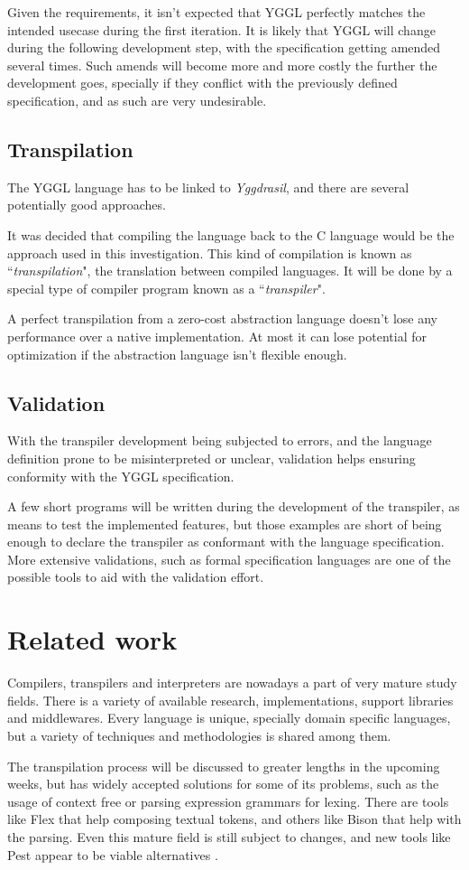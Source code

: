 \documentclass[runningheads]{llncs}
\begin{document}
\par Given the requirements, it isn't expected that YGGL perfectly matches the intended usecase during the first iteration. It is likely that YGGL will change during the following development step, with the specification getting amended several times. Such amends will become more and more costly the further the development goes, specially if they conflict with the previously defined specification, and as such are very undesirable.
\subsection{Transpilation}
The YGGL language has to be linked to \textit{Yggdrasil}, and there are several potentially good approaches.
\par It was decided that compiling the language back to the C language would be the approach used in this investigation. This kind of compilation is known as ``\textit{transpilation}", the translation between compiled languages. It will be done by a special type of compiler program known as a ``\textit{transpiler}".
\par A perfect transpilation from a zero-cost abstraction language doesn't lose any performance over a native implementation. At most it can lose potential for optimization if the abstraction language isn't flexible enough.
\subsection{Validation}
With the transpiler development being subjected to errors, and the language definition prone to be misinterpreted or unclear, validation helps ensuring conformity with the YGGL specification.
\par A few short programs will be written during the development of the transpiler, as means to test the implemented features, but those examples are short of being enough to declare the transpiler as conformant with the language specification. More extensive validations, such as formal specification languages are one of the possible tools to aid with the validation effort.

\section{Related work}
Compilers, transpilers and interpreters are nowadays a part of very mature study fields. There is a variety of available research, implementations, support libraries and middlewares. Every language is unique, specially domain specific languages, but a variety of techniques and methodologies is shared among them.
\par The transpilation process will be discussed to greater lengths in the upcoming weeks, but has widely accepted solutions for some of its problems, such as the usage of context free or parsing expression grammars for lexing. There are tools like Flex that help composing textual tokens, and others like Bison that help with the parsing. Even this mature field is still subject to changes, and new tools like Pest appear to be viable alternatives \cite{AppelModernCompiler:1997,FlexBisonLevine:2009,Pest:2019}.
\end{document}
